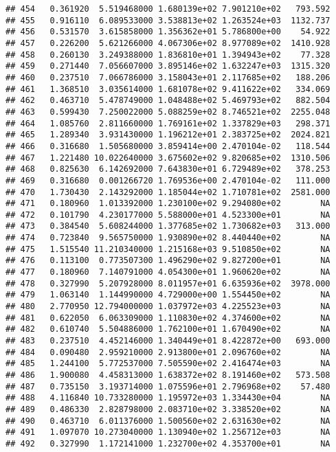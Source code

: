 \documentclass[
]{article}
\begin{document}
\begin{verbatim}
## 454   0.361920  5.519468000 1.680139e+02 7.901210e+02   793.592
## 455   0.916110  6.089533000 3.538813e+02 1.263524e+03  1132.737
## 456   0.531570  3.615858000 1.356362e+01 5.786800e+00    54.922
## 457   0.226200  5.621266000 4.067306e+02 8.977089e+02  1410.928
## 458   0.260130  3.249388000 1.836810e+01 1.394943e+02    77.328
## 459   0.271440  7.056607000 3.895146e+02 1.632247e+03  1315.320
## 460   0.237510  7.066786000 3.158043e+01 2.117685e+02   188.206
## 461   1.368510  3.035614000 1.681078e+02 9.411622e+02   334.069
## 462   0.463710  5.478749000 1.048488e+02 5.469793e+02   882.504
## 463   0.599430  7.250022000 5.088259e+02 8.746521e+02  2255.048
## 464   1.085760  2.811660000 1.769161e+02 1.337829e+03   298.371
## 465   1.289340  3.931430000 1.196212e+01 2.383725e+02  2024.821
## 466   0.316680  1.505680000 3.859414e+00 2.470104e-02   118.544
## 467   1.221480 10.022640000 3.675602e+02 9.820685e+02  1310.506
## 468   0.825630  6.142692000 7.643830e+01 6.729489e+02   378.253
## 469   0.316680  0.001266720 1.769536e+00 2.470104e-02   111.000
## 470   1.730430  2.143292000 1.185044e+02 1.710781e+02  2581.000
## 471   0.180960  1.013392000 1.230100e+02 9.294080e+02        NA
## 472   0.101790  4.230177000 5.588000e+01 4.523300e+01        NA
## 473   0.384540  5.608244000 1.377685e+02 1.730682e+03   313.000
## 474   0.723840  9.565750000 1.930890e+02 8.440440e+02        NA
## 475   1.515540 11.210340000 1.215168e+03 9.510850e+02        NA
## 476   0.113100  0.773507300 1.496290e+02 9.827200e+01        NA
## 477   0.180960  7.140791000 4.054300e+01 1.960620e+02        NA
## 478   0.327990  5.207928000 8.011957e+01 6.635936e+02  3978.000
## 479   1.063140  1.144990000 4.729000e+00 1.554450e+02        NA
## 480   2.770950 12.794000000 1.037972e+03 4.225523e+03        NA
## 481   0.622050  6.063309000 1.110830e+02 4.374600e+02        NA
## 482   0.610740  5.504886000 1.762100e+01 1.670490e+02        NA
## 483   0.237510  4.452146000 1.340449e+01 8.422872e+00   693.000
## 484   0.090480  2.959210000 2.913800e+01 2.096760e+02        NA
## 485   1.244100  5.772537000 7.505590e+02 2.416474e+03        NA
## 486   1.900080  4.458313000 1.638372e+02 8.191460e+02   573.508
## 487   0.735150  3.193714000 1.075596e+01 2.796968e+02    57.480
## 488   4.116840 10.733280000 1.195972e+03 1.334430e+04        NA
## 489   0.486330  2.828798000 2.083710e+02 3.338520e+02        NA
## 490   0.463710  6.011376000 1.500560e+02 2.631630e+02        NA
## 491   1.097070 10.273040000 1.130940e+02 1.256712e+03        NA
## 492   0.327990  1.172141000 1.232700e+02 4.353700e+01        NA

\end{verbatim}
\end{document}
